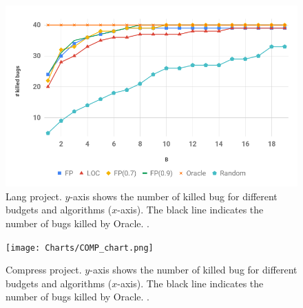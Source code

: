 \begin{}
\begin{figure}
    \centering
    \includegraphics[width=1\columnwidth]{Charts/LANG_chart.png}
    \caption{Lang project. $y$-axis shows the number of killed bug for different budgets and \btg algorithms ($x$-axis). The black line indicates the number of bugs killed by Oracle. .}
    \label{fig:lang}
\end{figure}


\begin{figure}
    \centering
    \texttt{[image: Charts/COMP\_chart.png]}
    \caption{Compress project. $y$-axis shows the number of killed bug for different budgets and \btg algorithms ($x$-axis). The black line indicates the number of bugs killed by Oracle. .}
    \label{fig:comp}
\end{figure}


\end{}
